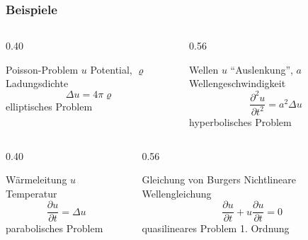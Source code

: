 %
%
%
\begin{frame}
\frametitle{Beispiele}
\begin{columns}[t]
\begin{column}{0.40\hsize}
\begin{block}{Poisson-Problem}
$u$ Potential, $\varrho$ Ladungsdichte
\[
\Delta u = 4\pi \varrho
\]
elliptisches Problem
\end{block}
\end{column}
\begin{column}{0.56\hsize}
\begin{block}{Wellen}
$u$ ``Auslenkung'', $a$ Wellengeschwindigkeit
\[
\frac{\partial^2 u}{\partial t^2} = a^2\Delta u
\]
hyperbolisches Problem
\end{block}
\end{column}
\end{columns}
\begin{columns}[t]
\begin{column}{0.40\hsize}
\begin{block}{Wärmeleitung}
$u$ Temperatur
\[
\frac{\partial u}{\partial t}  = \Delta u
\]
parabolisches Problem
\end{block}
\end{column}
\begin{column}{0.56\hsize}
\begin{block}{Gleichung von Burgers}
Nichtlineare Wellengleichung
\[
\frac{\partial u}{\partial t} + u\frac{\partial u}{\partial t} = 0
\]
quasilineares Problem 1. Ordnung
\end{block}
\end{column}
\end{columns}
\end{frame}
